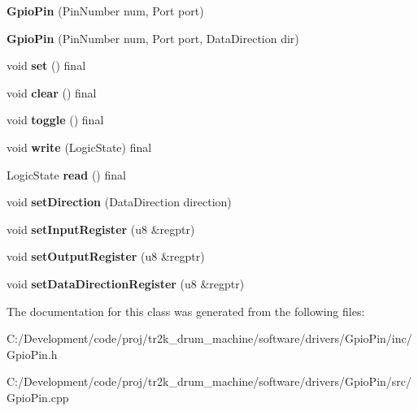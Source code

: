 \begin{DoxyCompactItemize}
\item 
\mbox{\label{class_gpio_pin_a823123512552fe7226d12aeccccbdf6b}} 
{\bfseries Gpio\+Pin} (Pin\+Number num, Port port)
\item 
\mbox{\label{class_gpio_pin_a1da774161af27f3b9a0df07c5fa55fcd}} 
{\bfseries Gpio\+Pin} (Pin\+Number num, Port port, Data\+Direction dir)
\item 
\mbox{\label{class_gpio_pin_abd7fb9623b696b1b2b567bd9ec2d6652}} 
void {\bfseries set} () final
\item 
\mbox{\label{class_gpio_pin_a3ba635762f002cd9128157b656a455a4}} 
void {\bfseries clear} () final
\item 
\mbox{\label{class_gpio_pin_a7acc995946d0e274699218dfa84ada9e}} 
void {\bfseries toggle} () final
\item 
\mbox{\label{class_gpio_pin_a454d7538fb4c333c725006028b7440cb}} 
void {\bfseries write} (Logic\+State) final
\item 
\mbox{\label{class_gpio_pin_a002cb2f31d95d3b2fd577d714164251b}} 
Logic\+State {\bfseries read} () final
\item 
\mbox{\label{class_gpio_pin_a0aef9e6efb8f955e07b6715a0801e51e}} 
void {\bfseries set\+Direction} (Data\+Direction direction)
\item 
\mbox{\label{class_gpio_pin_a721e97dfff89d09add23ae80ab869254}} 
void {\bfseries set\+Input\+Register} (u8 \&regptr)
\item 
\mbox{\label{class_gpio_pin_a0d12e95670d4426f50c419d9f6c2f954}} 
void {\bfseries set\+Output\+Register} (u8 \&regptr)
\item 
\mbox{\label{class_gpio_pin_a5389818286140e64e2383a4c2edacf63}} 
void {\bfseries set\+Data\+Direction\+Register} (u8 \&regptr)
\end{DoxyCompactItemize}


The documentation for this class was generated from the following files\+:\begin{DoxyCompactItemize}
\item 
C\+:/\+Development/code/proj/tr2k\+\_\+drum\+\_\+machine/software/drivers/\+Gpio\+Pin/inc/Gpio\+Pin.\+h\item 
C\+:/\+Development/code/proj/tr2k\+\_\+drum\+\_\+machine/software/drivers/\+Gpio\+Pin/src/Gpio\+Pin.\+cpp\end{DoxyCompactItemize}
